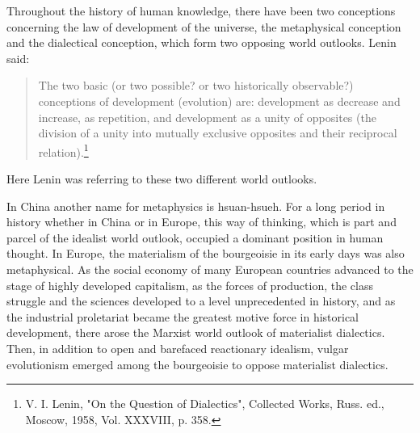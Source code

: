 \documentclass{article}
\begin{document}
Throughout the history of human knowledge, there have been two conceptions
concerning the law of development of the universe, the metaphysical
conception and the dialectical conception, which form two opposing world
outlooks. Lenin said:

\begin{quote} The two basic (or two possible? or two historically observable?)
conceptions of development (evolution) are: development as decrease and
increase, as repetition, and development as a unity of opposites (the division
of a unity into mutually exclusive opposites and their reciprocal
relation).\footnote{V. I. Lenin, "On the Question of Dialectics", Collected
Works, Russ. ed., Moscow, 1958, Vol. XXXVIII, p. 358.} \end{quote}

Here Lenin was referring to these two different world outlooks.

In China another name for metaphysics is hsuan-hsueh. For a long period in
history whether in China or in Europe, this way of thinking, which is part
and parcel of the idealist world outlook, occupied a dominant position in
human thought. In Europe, the materialism of the bourgeoisie in its early
days was also metaphysical. As the social economy of many European
countries advanced to the stage of highly developed capitalism, as the
forces of production, the class struggle and the sciences developed to
a level unprecedented in history, and as the industrial proletariat became
the greatest motive force in historical development, there arose the
Marxist world outlook of materialist dialectics. Then, in addition to open
and barefaced reactionary idealism, vulgar evolutionism emerged among the
bourgeoisie to oppose materialist dialectics.
\end{document}
